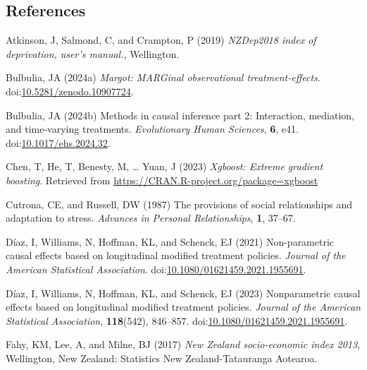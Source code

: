 \documentclass[
  single column]{article}
\newlength{\cslhangindent}
\newenvironment{CSLReferences}[2] %
 {\begin{list}{}{%
  \setlength{\itemindent}{0pt}
  \setlength{\leftmargin}{0pt}
  \setlength{\parsep}{0pt}
  \ifodd #1
   \setlength{\leftmargin}{\cslhangindent}
   \setlength{\itemindent}{-1\cslhangindent}
  \fi
  \setlength{\itemsep}{#2\baselineskip}}}
 {\end{list}}
\begin{document}
\newpage{}

\subsection*{References}\label{references}

\label{refs}
\begin{CSLReferences}{1}{0}
Atkinson, J, Salmond, C, and Crampton, P (2019) \emph{NZDep2018 index of
deprivation, user{'}s manual.}, Wellington.

Bulbulia, JA (2024a) \emph{Margot: MARGinal observational
treatment-effects}.
doi:\href{https://doi.org/10.5281/zenodo.10907724}{10.5281/zenodo.10907724}.

Bulbulia, JA (2024b) Methods in causal inference part 2: Interaction,
mediation, and time-varying treatments. \emph{Evolutionary Human
Sciences}, \textbf{6}, e41.
doi:\href{https://doi.org/10.1017/ehs.2024.32}{10.1017/ehs.2024.32}.

Chen, T, He, T, Benesty, M, \ldots{} Yuan, J (2023) \emph{Xgboost:
Extreme gradient boosting}. Retrieved from
\url{https://CRAN.R-project.org/package=xgboost}

Cutrona, CE, and Russell, DW (1987) The provisions of social
relationships and adaptation to stress. \emph{Advances in Personal
Relationships}, \textbf{1}, 37--67.

Díaz, I, Williams, N, Hoffman, KL, and Schenck, EJ (2021) Non-parametric
causal effects based on longitudinal modified treatment policies.
\emph{Journal of the American Statistical Association}.
doi:\href{https://doi.org/10.1080/01621459.2021.1955691}{10.1080/01621459.2021.1955691}.

Díaz, I, Williams, N, Hoffman, KL, and Schenck, EJ (2023) Nonparametric
causal effects based on longitudinal modified treatment policies.
\emph{Journal of the American Statistical Association},
\textbf{118}(542), 846--857.
doi:\href{https://doi.org/10.1080/01621459.2021.1955691}{10.1080/01621459.2021.1955691}.

Fahy, KM, Lee, A, and Milne, BJ (2017) \emph{{N}ew {Z}ealand
socio-economic index 2013}, Wellington, New Zealand: Statistics New
Zealand-Tatauranga Aotearoa.


\end{CSLReferences}
\end{document}
